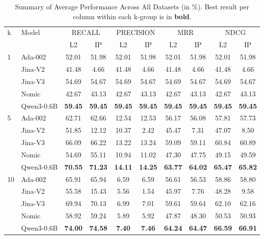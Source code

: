 \begin{table}[htbp!]
\centering
\footnotesize
\caption{Summary of Average Performance Across All Datasets (in \%). Best result per column within each k-group is in \textbf{{bold}}.}
\label{tab:summary}
\begin{tabular}{llcccccccc}
\toprule
\multirow{2}{*}{k} & \multirow{2}{*}{Model} & \multicolumn{2}{c}{RECALL} & \multicolumn{2}{c}{PRECISION} & \multicolumn{2}{c}{MRR} & \multicolumn{2}{c}{NDCG} \\
\cmidrule(lr){3-4} \cmidrule(lr){5-6} \cmidrule(lr){7-8} \cmidrule(lr){9-10}
& & L2 & IP & L2 & IP & L2 & IP & L2 & IP \\
\midrule
\multirow{5}{*}{1} & Ada-002 & 52.01 & 51.98 & 52.01 & 51.98 & 52.01 & 51.98 & 52.01 & 51.98 \\
& Jina-V2 & 41.48 & 4.66 & 41.48 & 4.66 & 41.48 & 4.66 & 41.48 & 4.66 \\
& Jina-V3 & 54.69 & 54.67 & 54.69 & 54.67 & 54.69 & 54.67 & 54.69 & 54.67 \\
& Nomic & 42.67 & 43.13 & 42.67 & 43.13 & 42.67 & 43.13 & 42.67 & 43.13 \\
& Qwen3-0.6B & \textbf{59.45} & \textbf{59.45} & \textbf{59.45} & \textbf{59.45} & \textbf{59.45} & \textbf{59.45} & \textbf{59.45} & \textbf{59.45} \\
\midrule
\multirow{5}{*}{5} & Ada-002 & 62.71 & 62.66 & 12.54 & 12.53 & 56.17 & 56.08 & 57.81 & 57.73 \\
& Jina-V2 & 51.85 & 12.12 & 10.37 & 2.42 & 45.47 & 7.31 & 47.07 & 8.50 \\
& Jina-V3 & 66.09 & 66.22 & 13.22 & 13.24 & 59.09 & 59.11 & 60.84 & 60.89 \\
& Nomic & 54.69 & 55.11 & 10.94 & 11.02 & 47.30 & 47.75 & 49.15 & 49.59 \\
& Qwen3-0.6B & \textbf{70.55} & \textbf{71.23} & \textbf{14.11} & \textbf{14.25} & \textbf{63.77} & \textbf{64.02} & \textbf{65.47} & \textbf{65.82} \\
\midrule
\multirow{5}{*}{10} & Ada-002 & 65.91 & 65.94 & 6.59 & 6.59 & 56.61 & 56.53 & 58.86 & 58.80 \\
& Jina-V2 & 55.58 & 15.43 & 5.56 & 1.54 & 45.97 & 7.76 & 48.28 & 9.58 \\
& Jina-V3 & 69.94 & 70.13 & 6.99 & 7.01 & 59.61 & 59.64 & 62.10 & 62.16 \\
& Nomic & 58.92 & 59.24 & 5.89 & 5.92 & 47.87 & 48.30 & 50.53 & 50.93 \\
& Qwen3-0.6B & \textbf{74.00} & \textbf{74.58} & \textbf{7.40} & \textbf{7.46} & \textbf{64.24} & \textbf{64.47} & \textbf{66.59} & \textbf{66.91} \\

\end{tabular}
\end{table}
